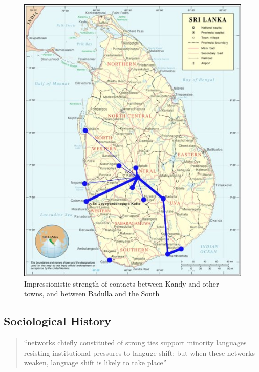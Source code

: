 \begin{figure}
 \centering
 \includegraphics[height=0.3\textheight]{pics/Kandy-network}
 \caption[Strength of contacts between Kandy and other towns]{Impressionistic strength of contacts between Kandy and other towns, and between Badulla and the South}
 \label{fig:Kandynetwork}
\end{figure}






\subsection{Sociological History}\label{sec:slmbg:SociologicalHistory}

\begin{quote}
	``networks chiefly constituted of strong ties support minority languages resisting institutional pressures to languge shift; but when these networks weaken, language shift is likely to take place''\citep[124]{MilroyEtAl2003}
\end{quote}

